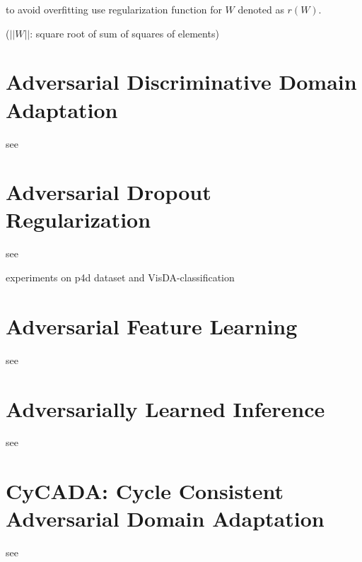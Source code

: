 to avoid overfitting use regularization function for $W$ denoted as $r(W)$. 


($||W||$: square root of sum of squares of elements)


\section{Adversarial Discriminative Domain Adaptation}

see \cite{DBLP:journals/corr/TzengHSD17}


\section{Adversarial Dropout Regularization}

see \cite{DBLP:journals/corr/abs-1711-01575}

experiments on p4d dataset and VisDA-classification\\

\section{Adversarial Feature Learning}

see \cite{DBLP:journals/corr/DonahueKD16}


\section{Adversarially Learned Inference}

see \cite{dumoulin2016adversarially}

\section{CyCADA: Cycle Consistent Adversarial Domain Adaptation}

see \cite{DBLP:journals/corr/abs-1711-03213}
 